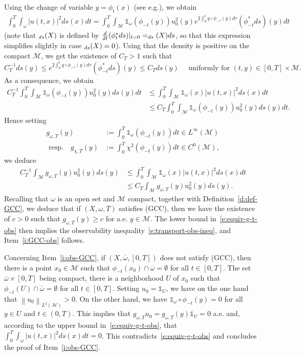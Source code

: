 \documentclass[10pt]{amsart}
\newcommand{\pGCC}{\textup{(GCC)}\xspace}
\theoremstyle{definition}
\newcommand{\M}{\ensuremath{\mathcal M}}
\let \div \relax
\DeclareMathOperator{\div}{div}
\newcommand\nor[2]{\left\|#1\right\|_{#2}}
\let\ovl\overline
\providecommand{\eg}{e.g.}\providecommand{\ie}{i.e.}\providecommand{\etc}{etc.}
\providecommand{\resp}{resp.}\providecommand{\cf}{cf.}
\begin{document}
Using the change of variable $y=\phi_t(x)$ (see \eg \cite[Prop.\,16.42 p432]{Lee:book}), we obtain
\begin{align*}
\int_0^T\int_\omega |u(t,x)|^2 ds(x)dt
= \int_0^T\int_\M \mathds{1}_\omega(\phi_{-t}(y)) u_0^2(y)e^{2\int_0^tq \circ\phi_{-\tau}(y)d\tau} (\phi_{-t}^*ds)(y)dt
\end{align*}
(note that $\div_{ds}(X)$ is defined by $\frac{d}{dt} (\phi_{t}^*ds)|_{t=0} = \div_{ds}(X) ds$, so that this expression simplifies slightly in case $\div_{ds}(X)=0$).
Using that the density is positive on the compact $\M$, we get the existence of $C_T>1$ such that
\[
C_T^{-1} ds(y) \leq e^{2\int_0^tq \circ\phi_{-\tau}(y)d\tau} (\phi_{-t}^*ds)(y) \leq C_T ds(y) \quad \text{ uniformly for } (t,y) \in [0,T]\times \M.
\]
As a consequence, we obtain
\begin{align*}
C_T^{-1} \int_0^T\int_\M \mathds{1}_\omega(\phi_{-t}(y)) u_0^2(y) ds(y)dt
& \leq \int_0^T\int_\M \mathds{1}_\omega(x) |u(t,x)|^2 ds(x)dt \\
& \leq C_T \int_0^T\int_\M \mathds{1}_\omega(\phi_{-t}(y)) u_0^2(y) ds(y)dt.
\end{align*}
Hence setting
\begin{align*}
g_{\omega,T}(y) &:= \int_0^T \mathds{1}_\omega(\phi_{-t}(y)) dt \in L^\infty(\M) \\
\text{ \resp } \quad g_{\chi,T}(y) &:= \int_0^T \chi^2 (\phi_{-t}(y)) dt \in C^0(\M),
\end{align*}
we deduce
\begin{align}
\label{e:equiv-g-t-obs}
C_T^{-1} \int_\M g_{\omega,T}(y) u_0^2(y) ds(y)
& \leq \int_0^T\int_{\M} \mathds{1}_\omega(x) |u(t,x)|^2 ds(x)dt \nonumber \\
& \leq C_T \int_\M g_{\omega,T}(y) u_0^2(y) ds(y).
\end{align}
Recalling that $\omega$ is an open set and $\M$ compact, together with Definition~\ref{d:def-GCC}, we deduce that if $(X,\omega,T)$ satisfies \pGCC, then we have the existence of $c>0$ such that $g_{\omega,T}(y)\geq c$ for a.e. $y\in\M$. The lower bound in~\eqref{e:equiv-g-t-obs} then implies the observability inequality~\eqref{e:transport-obs-ineq}, and Item~\eqref{i:GCC-obs} follows.

Concerning Item~\eqref{i:obs-GCC}, if $(X,\ovl{\omega},[0,T])$ does not satisfy \pGCC, then there is a point $x_0\in \M$ such that $\phi_{-t}(x_0) \cap \ovl{\omega} = \emptyset$ for all $t\in [0,T]$. The set $\ovl{\omega}\times [0,T]$ being compact, there is a neighborhood $U$ of $x_0$ such that $\phi_{-t}(U) \cap \ovl{\omega} = \emptyset$ for all $t\in [0,T]$. Setting $u_0 = \mathds{1}_U$, we have on the one hand that $\nor{u_0}{L^2(\M)} >0$. On the other hand, we have $\mathds{1}_{\omega}\circ \phi_{-t}(y)= 0$ for all $y\in U$ and $t\in (0,T)$. This implies that $g_{\omega,T} u_0 = g_{\omega,T}(y) \mathds{1}_U = 0$ a.e. and, according to the upper bound in~\eqref{e:equiv-g-t-obs}, that $\int_0^T\int_\omega |u(t,x)|^2 ds(x)dt =0$. This contradicts~\eqref{e:equiv-g-t-obs} and concludes the proof of Item~\eqref{i:obs-GCC}.
\end{document}
